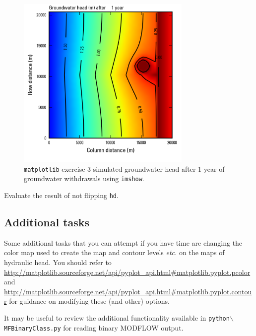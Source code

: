 \documentclass[12pt]{article}
\begin{document}
\begin{figure}
	\centering
  	\includegraphics[width=0.75\textwidth]{figures/imshowHead_36865.png}
 	\caption{\texttt{matplotlib} exercise 3 simulated groundwater head after 1 year of groundwater withdrawals using \texttt{imshow}.}
	\label{FigEx3HeadMap2}
\end{figure}

Evaluate the result of not flipping \texttt{hd}.

\subsection{Additional tasks}
Some additional tasks that you can attempt if you have time are changing the color map used to create the map and contour levels \textit{etc.} on the maps of hydraulic head. You should refer to \url{http://matplotlib.sourceforge.net/api/pyplot_api.html\#matplotlib.pyplot.pcolor} and \url{http://matplotlib.sourceforge.net/api/pyplot_api.html\#matplotlib.pyplot.contour} for guidance on modifying these (and other) options.

It may be useful to review the additional functionality available in \texttt{python$\backslash$MFBinaryClass.py} for reading binary MODFLOW output.
\end{document}
